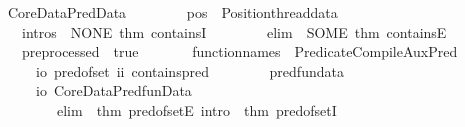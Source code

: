 \begin{isabellebody}
\ \ \ \ \ Core{\isacharunderscore}{\kern0pt}Data{\isachardot}{\kern0pt}PredData\ {\isacharbraceleft}{\kern0pt}\isanewline
\ \ \ \ \ \ \ pos\ {\isacharequal}{\kern0pt}\ Position{\isachardot}{\kern0pt}thread{\isacharunderscore}{\kern0pt}data\ {\isacharparenleft}{\kern0pt}{\isacharparenright}{\kern0pt}{\isacharcomma}{\kern0pt}\isanewline
\ \ \ \ \ \ \ intros\ {\isacharequal}{\kern0pt}\ {\isacharbrackleft}{\kern0pt}{\isacharparenleft}{\kern0pt}NONE{\isacharcomma}{\kern0pt}\ {\isacharat}{\kern0pt}{\isacharbraceleft}{\kern0pt}thm\ containsI{\isacharbraceright}{\kern0pt}{\isacharparenright}{\kern0pt}{\isacharbrackright}{\kern0pt}{\isacharcomma}{\kern0pt}\ \isanewline
\ \ \ \ \ \ \ elim\ {\isacharequal}{\kern0pt}\ SOME\ {\isacharat}{\kern0pt}{\isacharbraceleft}{\kern0pt}thm\ containsE{\isacharbraceright}{\kern0pt}{\isacharcomma}{\kern0pt}\ \isanewline
\ \ \ \ \ \ \ preprocessed\ {\isacharequal}{\kern0pt}\ true{\isacharcomma}{\kern0pt}\isanewline
\ \ \ \ \ \ \ function{\isacharunderscore}{\kern0pt}names\ {\isacharequal}{\kern0pt}\ {\isacharbrackleft}{\kern0pt}{\isacharparenleft}{\kern0pt}Predicate{\isacharunderscore}{\kern0pt}Compile{\isacharunderscore}{\kern0pt}Aux{\isachardot}{\kern0pt}Pred{\isacharcomma}{\kern0pt}\ \isanewline
\ \ \ \ \ \ \ \ \ {\isacharbrackleft}{\kern0pt}{\isacharparenleft}{\kern0pt}io{\isacharcomma}{\kern0pt}\ \isactrlconstUNDERSCOREname {\isasymopen}pred{\isacharunderscore}{\kern0pt}of{\isacharunderscore}{\kern0pt}set{\isasymclose}{\isacharparenright}{\kern0pt}{\isacharcomma}{\kern0pt}\ {\isacharparenleft}{\kern0pt}ii{\isacharcomma}{\kern0pt}\ \isactrlconstUNDERSCOREname {\isasymopen}contains{\isacharunderscore}{\kern0pt}pred{\isasymclose}{\isacharparenright}{\kern0pt}{\isacharbrackright}{\kern0pt}{\isacharparenright}{\kern0pt}{\isacharbrackright}{\kern0pt}{\isacharcomma}{\kern0pt}\ \isanewline
\ \ \ \ \ \ \ predfun{\isacharunderscore}{\kern0pt}data\ {\isacharequal}{\kern0pt}\ {\isacharbrackleft}{\kern0pt}\isanewline
\ \ \ \ \ \ \ \ \ {\isacharparenleft}{\kern0pt}io{\isacharcomma}{\kern0pt}\ Core{\isacharunderscore}{\kern0pt}Data{\isachardot}{\kern0pt}PredfunData\ {\isacharbraceleft}{\kern0pt}\isanewline
\ \ \ \ \ \ \ \ \ \ \ \ elim\ {\isacharequal}{\kern0pt}\ {\isacharat}{\kern0pt}{\isacharbraceleft}{\kern0pt}thm\ pred{\isacharunderscore}{\kern0pt}of{\isacharunderscore}{\kern0pt}setE{\isacharbraceright}{\kern0pt}{\isacharcomma}{\kern0pt}\ intro\ {\isacharequal}{\kern0pt}\ {\isacharat}{\kern0pt}{\isacharbraceleft}{\kern0pt}thm\ pred{\isacharunderscore}{\kern0pt}of{\isacharunderscore}{\kern0pt}setI{\isacharbraceright}{\kern0pt}{\isacharcomma}{\kern0pt}\isanewline

\end{isabellebody}
